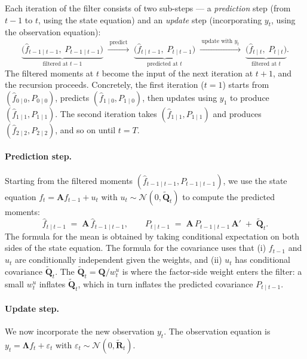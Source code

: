 \documentclass[11pt, a4paper, oneside]{article}
\newcommand{\mL}{\boldsymbol{\Lambda}}
\newcommand{\mA}{\mathbf{A}}
\newcommand{\mR}{\mathbf{R}}
\newcommand{\mQ}{\mathbf{Q}}
\begin{document}
Each iteration of the filter consists of two sub-steps — a
\emph{prediction} step (from $t-1$ to $t$, using the state equation)
and an \emph{update} step (incorporating $y_t$, using the observation
equation):
\[
\underbrace{\big(\hat{f}_{t-1 \mid t-1},\; P_{t-1 \mid t-1}\big)}_{\text{filtered at } t-1}
\;\xrightarrow{\;\text{predict}\;}\;
\underbrace{\big(\hat{f}_{t \mid t-1},\; P_{t \mid t-1}\big)}_{\text{predicted at } t}
\;\xrightarrow{\;\text{update with } y_t\;}\;
\underbrace{\big(\hat{f}_{t \mid t},\; P_{t \mid t}\big)}_{\text{filtered at } t}.
\]
The filtered moments at $t$ become the input of the next iteration
at $t+1$, and the recursion proceeds. Concretely, the first iteration
($t = 1$) starts from $(\hat{f}_{0 \mid 0}, P_{0 \mid 0})$, predicts
$(\hat{f}_{1 \mid 0}, P_{1 \mid 0})$, then updates using $y_1$ to
produce $(\hat{f}_{1 \mid 1}, P_{1 \mid 1})$. The second iteration
takes $(\hat{f}_{1 \mid 1}, P_{1 \mid 1})$ and produces
$(\hat{f}_{2 \mid 2}, P_{2 \mid 2})$, and so on until $t = T$.


\paragraph{Prediction step.}
Starting from the filtered moments $(\hat{f}_{t-1 \mid t-1}, P_{t-1 \mid t-1})$,
we use the state equation $f_t = \mA f_{t-1} + u_t$ with
$u_t \sim \mathcal{N}(0, \tilde{\mQ}_t)$ to compute the predicted moments:
\begin{equation}
\boxed{\;\;
\hat{f}_{t \mid t-1} \;=\; \mA\, \hat{f}_{t-1 \mid t-1},
\qquad
P_{t \mid t-1} \;=\; \mA\, P_{t-1 \mid t-1}\, \mA' \;+\; \tilde{\mQ}_t.
\;\;}
\label{eq:kf-predict}
\end{equation}
The formula for the mean is obtained by taking conditional expectation
on both sides of the state equation. The formula for the covariance
uses that (i) $f_{t-1}$ and $u_t$ are conditionally independent given
the weights, and (ii) $u_t$ has conditional covariance $\tilde{\mQ}_t$.
The \emph{$\tilde{\mQ}_t = \mQ / w^u_t$} is where the factor-side weight
enters the filter: a small $w^u_t$ inflates $\tilde{\mQ}_t$, which in
turn inflates the predicted covariance $P_{t \mid t-1}$.

\paragraph{Update step.}
We now incorporate the new observation $y_t$. The observation equation
is $y_t = \mL f_t + \varepsilon_t$ with $\varepsilon_t \sim \mathcal{N}(0, \tilde{\mR}_t)$.
\end{document}
